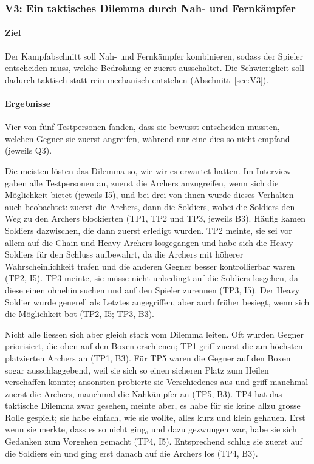 \documentclass[../Main.tex]{subfiles}
\begin{document}
\subsubsection{V3: Ein taktisches Dilemma durch Nah- und Fernkämpfer}

\paragraph{Ziel}
Der Kampfabschnitt soll Nah- und Fernkämpfer kombinieren, sodass der Spieler entscheiden muss, welche Bedrohung er zuerst ausschaltet. Die Schwierigkeit soll dadurch taktisch statt rein mechanisch entstehen (Abschnitt~\ref{sec:V3}).

\paragraph{Ergebnisse}
Vier von fünf Testpersonen fanden, dass sie bewusst entscheiden mussten, welchen Gegner sie zuerst angreifen, während nur eine dies so nicht empfand (jeweils Q3).

Die meisten lösten das Dilemma so, wie wir es erwartet hatten. Im Interview gaben alle Testpersonen an, zuerst die Archers anzugreifen, wenn sich die Möglichkeit bietet (jeweils I5), und bei drei von ihnen wurde dieses Verhalten auch beobachtet: zuerst die Archers, dann die Soldiers, wobei die Soldiers den Weg zu den Archers blockierten (TP1, TP2 und TP3, jeweils B3). Häufig kamen Soldiers dazwischen, die dann zuerst erledigt wurden. TP2 meinte, sie sei vor allem auf die Chain und Heavy Archers losgegangen und habe sich die Heavy Soldiers für den Schluss aufbewahrt, da die Archers mit höherer Wahrscheinlichkeit trafen und die anderen Gegner besser kontrollierbar waren (TP2, I5). TP3 meinte, sie müsse nicht unbedingt auf die Soldiers losgehen, da diese einen ohnehin suchen und auf den Spieler zurennen (TP3, I5). Der Heavy Soldier wurde generell als Letztes angegriffen, aber auch früher besiegt, wenn sich die Möglichkeit bot (TP2, I5; TP3, B3).

Nicht alle liessen sich aber gleich stark vom Dilemma leiten. Oft wurden Gegner priorisiert, die oben auf den Boxen erschienen; TP1 griff zuerst die am höchsten platzierten Archers an (TP1, B3). Für TP5 waren die Gegner auf den Boxen sogar ausschlaggebend, weil sie sich so einen sicheren Platz zum Heilen verschaffen konnte; ansonsten probierte sie Verschiedenes aus und griff manchmal zuerst die Archers, manchmal die Nahkämpfer an (TP5, B3). TP4 hat das taktische Dilemma zwar gesehen, meinte aber, es habe für sie keine allzu grosse Rolle gespielt; sie habe einfach, wie sie wollte, alles kurz und klein gehauen. Erst wenn sie merkte, dass es so nicht ging, und dazu gezwungen war, habe sie sich Gedanken zum Vorgehen gemacht (TP4, I5). Entsprechend schlug sie zuerst auf die Soldiers ein und ging erst danach auf die Archers los (TP4, B3).
\end{document}
